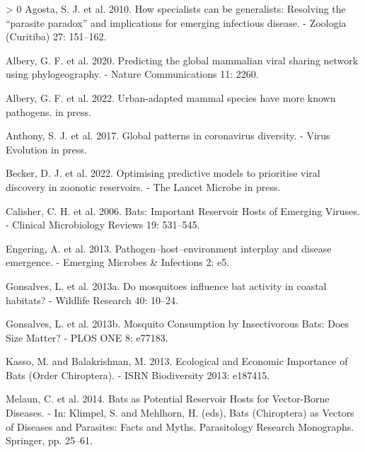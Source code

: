 \documentclass[10pt,oneside]{article}
\newlength{\cslhangindent}
\newenvironment{CSLReferences}[3] %
 {%
  \setlength{\parindent}{0pt}
  \ifodd #1 \everypar{\setlength{\hangindent}{\cslhangindent}}\ignorespaces\fi
  \ifnum #2 > 0
  \setlength{\parskip}{#2\baselineskip}
  \fi
 }%
 {}
\begin{document}
\hypertarget{refs}{}
\begin{CSLReferences}{1}{0}
\leavevmode\hypertarget{ref-Agosta2010HowSpe}{}%
Agosta, S. J. et al. 2010. How specialists can be generalists: Resolving
the {``parasite paradox''} and implications for emerging infectious
disease. - Zoologia (Curitiba) 27: 151--162.

\leavevmode\hypertarget{ref-Albery2020PreGlo}{}%
Albery, G. F. et al. 2020. Predicting the global mammalian viral sharing
network using phylogeography. - Nature Communications 11: 2260.

\leavevmode\hypertarget{ref-Albery2022UrbMam}{}%
Albery, G. F. et al. 2022. Urban-adapted mammal species have more known
pathogens. in press.

\leavevmode\hypertarget{ref-Anthony2017GloPat}{}%
Anthony, S. J. et al. 2017. Global patterns in coronavirus diversity. -
Virus Evolution in press.

\leavevmode\hypertarget{ref-Becker2022OptPre}{}%
Becker, D. J. et al. 2022. Optimising predictive models to prioritise
viral discovery in zoonotic reservoirs. - The Lancet Microbe in press.

\leavevmode\hypertarget{ref-Calisher2006BatImp}{}%
Calisher, C. H. et al. 2006. Bats: Important Reservoir Hosts of Emerging
Viruses. - Clinical Microbiology Reviews 19: 531--545.

\leavevmode\hypertarget{ref-Engering2013PatHos}{}%
Engering, A. et al. 2013. Pathogen--host--environment interplay and
disease emergence. - Emerging Microbes \& Infections 2: e5.

\leavevmode\hypertarget{ref-Gonsalves2013MosInf}{}%
Gonsalves, L. et al. 2013a. Do mosquitoes influence bat activity in
coastal habitats? - Wildlife Research 40: 10--24.

\leavevmode\hypertarget{ref-Gonsalves2013MosCon}{}%
Gonsalves, L. et al. 2013b. Mosquito Consumption by Insectivorous Bats:
Does Size Matter? - PLOS ONE 8: e77183.

\leavevmode\hypertarget{ref-Kasso2013EcoEco}{}%
Kasso, M. and Balakrishnan, M. 2013. Ecological and Economic Importance
of Bats (Order Chiroptera). - ISRN Biodiversity 2013: e187415.

\leavevmode\hypertarget{ref-Melaun2014BatPot}{}%
Melaun, C. et al. 2014. Bats as Potential Reservoir Hosts for
Vector-Borne Diseases. - In: Klimpel, S. and Mehlhorn, H. (eds), Bats
(Chiroptera) as Vectors of Diseases and Parasites: Facts and Myths.
Parasitology Research Monographs. Springer, pp. 25--61.


\end{CSLReferences}
\end{document}
